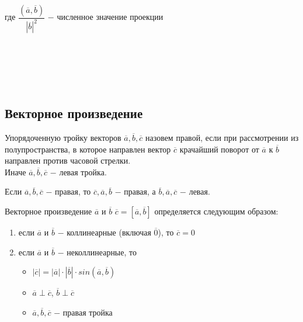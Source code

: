 где $\dfrac{(\overline{a}, \overline{b})}{|\overline{b}|^2}$ $-$ численное значение проекции

\tab\\ \tab\\ \tab\\ \tab\\

\subsection{Векторное произведение}

\begin{definition}
    Упорядоченную тройку векторов $\overline{a}, \overline{b}, \overline{c}$ назовем $\textit{правой}$, если при рассмотрении из полупространства, в которое направлен вектор $\overline{c}$ крачайший поворот от $\overline{a}$  к $\overline{b}$ направлен против часовой стрелки.\\

    Иначе $\overline{a}, \overline{b}, \overline{c}$ $-$ $\textit{левая}$ тройка.
\end{definition}

Если $\overline{a}, \overline{b}, \overline{c}$ $-$ правая, то $\overline{c}, \overline{a}, \overline{b}$ $-$ правая, а $\overline{b}, \overline{a}, \overline{c}$ $-$ левая.

\begin{definition}
    $\textit{Векторное произведение}$ $\overline{a}$ и $\overline{b}$  $\overline{c} = [\overline{a}, \overline{b}]$ определяется следующим образом:
    \begin{enumerate}
        \item если $\overline{a}$ и $\overline{b}$ $-$ коллинеарные (включая $\overline{0}$), то $\overline{c} = 0$
        \item если $\overline{a}$ и $\overline{b}$ $-$ неколлинеарные, то 
        \begin{itemize}
            \item $|\overline{c}| = |\overline{a}|\cdot|\overline{b}|\cdot sin(\overline{a}, \overline{b})$
            \item $\overline{a}\perp\overline{c}$, $\overline{b}\perp\overline{c}$
            \item $\overline{a}, \overline{b}, \overline{c}$ $-$ правая тройка
        \end{itemize}
    \end{enumerate}
\end{definition}

